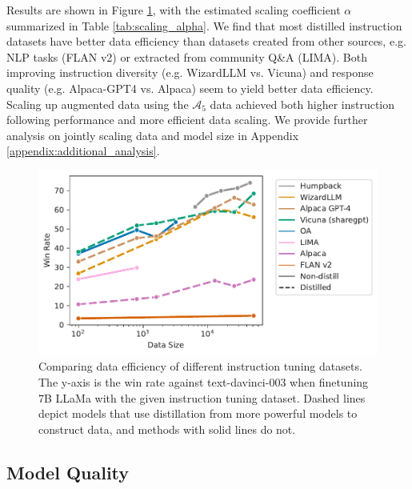 Results are  shown in Figure \ref{fig:data_scaling_all_7b}, with the estimated scaling coefficient $\alpha$ summarized in Table \ref{tab:scaling_alpha}. 
We find that most distilled instruction datasets have better data efficiency than datasets created from other sources, e.g. NLP tasks (FLAN v2) or extracted from community Q\&A (LIMA). Both improving instruction diversity (e.g. WizardLLM vs. Vicuna) and response quality (e.g. Alpaca-GPT4 vs. Alpaca) seem to yield better data efficiency. Scaling up augmented data using the $\mathcal{A}_5$  data achieved both higher instruction following performance and more efficient data scaling. We provide further analysis on jointly scaling data and model size in Appendix \ref{appendix:additional_analysis}. 
\begin{figure}
  \centering
  \includegraphics[width=0.75\columnwidth]{figs/data_scaling_all_7b.pdf}
  \caption{Comparing data efficiency of different instruction tuning datasets. The y-axis is the win rate against text-davinci-003 when finetuning 7B LLaMa with the given instruction tuning dataset.
  Dashed lines depict models that use distillation from more powerful models to construct data, and methods with solid lines do not.
  }
  \label{fig:data_scaling_all_7b}
\end{figure}







\subsection{Model Quality}

